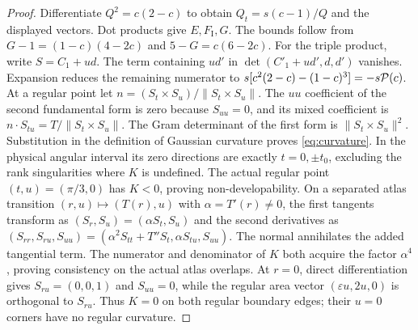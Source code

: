 \documentclass[11pt,a4paper]{article}
\theoremstyle{definition}\newtheorem{definition}[theorem]{Definition}
\theoremstyle{remark}\newtheorem{remark}[theorem]{Remark}
\begin{document}
\begin{proof}
Differentiate $Q^2=c(2-c)$ to obtain $Q_t=s(c-1)/Q$ and the displayed
vectors. Dot products give $E,F_{\mathrm I},G$. The bounds follow from
$G-1=(1-c)(4-2c)$ and $5-G=c(6-2c)$.
For the triple product, write $S=C_1+u d$. The term containing $u d'$ in
$\det(C'_1+ud',d,d')$ vanishes. Expansion reduces the remaining
numerator to
$s[c^2(2-c)-(1-c)^3]=-s\mathcal P(c)$.
At a regular point let $n=(S_t\times S_u)/\lVert S_t\times S_u\rVert$.
The $uu$ coefficient of the second fundamental form is zero because
$S_{uu}=0$, and its mixed coefficient is $n\cdot S_{tu}=T/\lVert
S_t\times S_u\rVert$. The Gram determinant of the first form is
$\lVert S_t\times S_u\rVert^2$. Substitution in the definition of
Gaussian curvature proves \eqref{eq:curvature}. In the physical angular
interval its zero directions are exactly $t=0,\pm t_0$, excluding the rank
singularities where $K$ is undefined. The actual regular point
$(t,u)=(\pi/3,0)$ has $K<0$, proving non-developability.
On a separated atlas transition $(r,u)\mapsto(T(r),u)$ with
$\alpha=T'(r)\ne0$, the first tangents transform as
$(S_r,S_u)=(\alpha S_t,S_u)$ and the second derivatives as
$(S_{rr},S_{ru},S_{uu})=(\alpha^2S_{tt}+T''S_t,\alpha S_{tu},S_{uu})$.
The normal annihilates the added tangential term. The numerator and
denominator of $K$ both acquire the factor $\alpha^4$, proving
consistency on the actual atlas overlaps. At $r=0$, direct differentiation
gives $S_{ru}=(0,0,1)$ and $S_{uu}=0$, while the regular area vector
$(\varepsilon u,2u,0)$ is orthogonal to $S_{ru}$. Thus $K=0$ on both
regular boundary edges; their $u=0$ corners have no regular curvature.
\end{proof}
\end{document}
